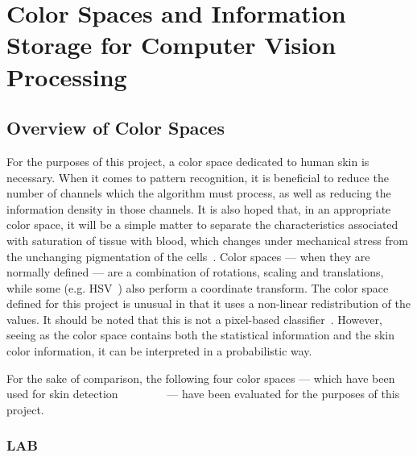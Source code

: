
\chapter{Color Spaces and Information Storage for Computer Vision Processing}

\ifpdf
    \graphicspath{{Chapter2/Figs/Raster/}{Chapter2/Figs/PDF/}{Chapter2/Figs/}}
\else
    \graphicspath{{Chapter2/Figs/Vector/}{Chapter2/Figs/}}
\fi


\section{Overview of Color Spaces}

For the purposes of this project, a color space dedicated to human skin is necessary. When it comes to pattern recognition, it is beneficial to reduce the number of channels which the algorithm must process, as well as reducing the information density in those channels. It is also hoped that, in an appropriate color space, it will be a simple matter to separate the characteristics associated with saturation of tissue with blood, which changes under mechanical stress from the unchanging pigmentation of the cells~\cite{Stamatas2004}. Color spaces --- when they are normally defined --- are a combination of rotations, scaling and translations, while some (e.g. HSV~\citeyear{Vezhnevets2003, Zarit1999a}) also perform a coordinate transform. The color space defined for this project is unusual in that it uses a non-linear redistribution of the values. It should be noted that this is not a pixel-based classifier~\cite{Jones2002}. However, seeing as the color space contains both the statistical information and the skin color information, it can be interpreted in a probabilistic way.

For the sake of comparison, the following four color spaces --- which have been used for skin detection~\cite{Vezhnevets2003}~\cite{Zarit1999a}~\cite{Yang1997a}~\cite{Yang1998a}~\cite{Brand2000a}~\cite{Sigal2000a}~\cite{Chai2000a}~\cite{Phung2002a} --- have been evaluated for the purposes of this project.

\subsection{LAB}\label{sec:LAB}

